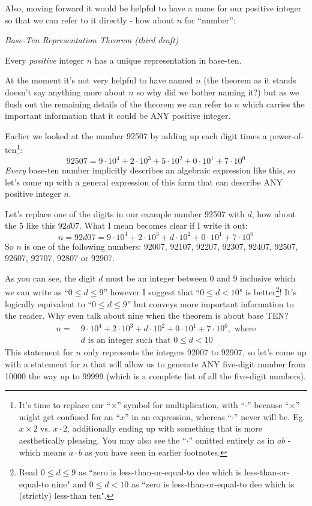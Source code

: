 \documentclass{article}
\newenvironment{jprIn}{\begin{adjustwidth}{2em}{}}{\end{adjustwidth}}
\begin{document}
Also, moving forward it would be helpful to have a name for our 
positive integer so that we can refer to it directly - how about $n$ for ``number'':

\emph{Base-Ten Representation Theorem (third draft)}
\begin{jprIn}
Every \emph{positive} integer $n$ has a unique representation in base-ten.
\end{jprIn}

At the moment it's not very helpful to have named $n$ (the theorem as it stands
doesn't say anything more about $n$ so why did we bother naming it?) but
as we flush out the remaining details of the theorem
we can refer to $n$ which carries the important information that it could be ANY positive integer.

Earlier we looked at the number 92507 by adding up
each digit times a power-of-ten\footnote{It's time
to replace our ``$\times{}$'' symbol for multiplication, with ``$\cdot{}$''
because ``$\times{}$'' might get confused for an ``$x$'' in an expression,
whereas ``$\cdot{}$'' never will be. Eg. $x\times{}2$
vs. $x\cdot{}2$, additionally ending up with something that is more aesthetically pleasing.
You may also see the ``$\cdot$'' omitted entirely as
in $ab$ - which means $a\cdot{}b$ as you have seen in earlier footnotes.}:
\[92507=9{\cdot}10^4+2{\cdot}10^3+5{\cdot}10^2+0{\cdot}10^1+7{\cdot}10^0\]
\emph{Every} base-ten number implicitly describes an algebraic expression like this, so
let's come up
with a general expression of this form that can describe ANY positive integer $n$.

Let's replace one of the digits in our example number 92507 with $d$, how about the 5 like this $92d07$. What I
mean becomes clear if I write it out:
\[n=92d07=9{\cdot}10^4+2{\cdot}10^3+d{\cdot}10^2+0{\cdot}10^1+7{\cdot}10^0\]
So $n$ is one of the following numbers:
92007,
92107,
92207,
92307,
92407,
92507,
92607,
92707,
92807 or
92907.

As you can see, the digit $d$ must be an integer between 0 and 9 inclusive 
which we can write as ``$0\le{}d\le{}9$'' however I suggest that ``$0\le{}d<10$" is better\footnote{Read 
$0\le{}d\le{}9$ as ``zero is less-than-or-equal-to dee which is less-than-or-equal-to nine"
and $0\le{}d<10$ as ``zero is less-than-or-equal-to dee which is (strictly) less-than ten".}!
It's logically equivalent to ``$0\le{}d\le{}9$''  but conveys more important information
to the reader. Why even talk about nine when the theorem is about base TEN?
\begin{align*}
n =\ &9{\cdot}10^4+2{\cdot}10^3+d{\cdot}10^2+0{\cdot}10^1+7{\cdot}10^0,\text{ where}\\
&d\text{ is an integer such that }0\le{}d<10
\end{align*}
This statement for $n$ only represents the integers 92007 to 92907, so let's come up
with a statement for $n$ that will allow us to generate ANY five-digit number from 10000 
the way up to 99999 (which is a complete list of all the five-digit numbers).
\end{document}

